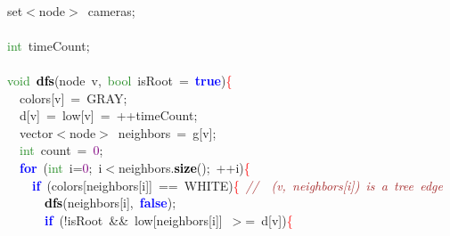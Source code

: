 {{\mbox{} \\
\mbox{}set\textcolor{BrickRed}{$<$}node\textcolor{BrickRed}{$>$}\ cameras\textcolor{BrickRed}{;} \\
\mbox{} \\
\mbox{}\textcolor{ForestGreen}{int}\ timeCount\textcolor{BrickRed}{;} \\
\mbox{} \\
\mbox{}\textcolor{ForestGreen}{void}\ \textbf{\textcolor{Black}{dfs}}\textcolor{BrickRed}{(}node\ v\textcolor{BrickRed}{,}\ \textcolor{ForestGreen}{bool}\ isRoot\ \textcolor{BrickRed}{=}\ \textbf{\textcolor{Blue}{true}}\textcolor{BrickRed}{)}\textcolor{Red}{\{} \\
\mbox{}\ \ colors\textcolor{BrickRed}{[}v\textcolor{BrickRed}{]}\ \textcolor{BrickRed}{=}\ GRAY\textcolor{BrickRed}{;} \\
\mbox{}\ \ d\textcolor{BrickRed}{[}v\textcolor{BrickRed}{]}\ \textcolor{BrickRed}{=}\ low\textcolor{BrickRed}{[}v\textcolor{BrickRed}{]}\ \textcolor{BrickRed}{=}\ \textcolor{BrickRed}{++}timeCount\textcolor{BrickRed}{;} \\
\mbox{}\ \ vector\textcolor{BrickRed}{$<$}node\textcolor{BrickRed}{$>$}\ neighbors\ \textcolor{BrickRed}{=}\ g\textcolor{BrickRed}{[}v\textcolor{BrickRed}{];} \\
\mbox{}\ \ \textcolor{ForestGreen}{int}\ count\ \textcolor{BrickRed}{=}\ \textcolor{Purple}{0}\textcolor{BrickRed}{;} \\
\mbox{}\ \ \textbf{\textcolor{Blue}{for}}\ \textcolor{BrickRed}{(}\textcolor{ForestGreen}{int}\ i\textcolor{BrickRed}{=}\textcolor{Purple}{0}\textcolor{BrickRed}{;}\ i\textcolor{BrickRed}{$<$}neighbors\textcolor{BrickRed}{.}\textbf{\textcolor{Black}{size}}\textcolor{BrickRed}{();}\ \textcolor{BrickRed}{++}i\textcolor{BrickRed}{)}\textcolor{Red}{\{} \\
\mbox{}\ \ \ \ \textbf{\textcolor{Blue}{if}}\ \textcolor{BrickRed}{(}colors\textcolor{BrickRed}{[}neighbors\textcolor{BrickRed}{[}i\textcolor{BrickRed}{]]}\ \textcolor{BrickRed}{==}\ WHITE\textcolor{BrickRed}{)}\textcolor{Red}{\{}\ \textit{\textcolor{Brown}{//\ \ (v,\ neighbors[i])\ is\ a\ tree\ edge}} \\
\mbox{}\ \ \ \ \ \ \textbf{\textcolor{Black}{dfs}}\textcolor{BrickRed}{(}neighbors\textcolor{BrickRed}{[}i\textcolor{BrickRed}{],}\ \textbf{\textcolor{Blue}{false}}\textcolor{BrickRed}{);} \\
\mbox{}\ \ \ \ \ \ \textbf{\textcolor{Blue}{if}}\ \textcolor{BrickRed}{(!}isRoot\ \textcolor{BrickRed}{\&\&}\ low\textcolor{BrickRed}{[}neighbors\textcolor{BrickRed}{[}i\textcolor{BrickRed}{]]}\ \textcolor{BrickRed}{$>$=}\ d\textcolor{BrickRed}{[}v\textcolor{BrickRed}{])}\textcolor{Red}{\{} \\
}}
